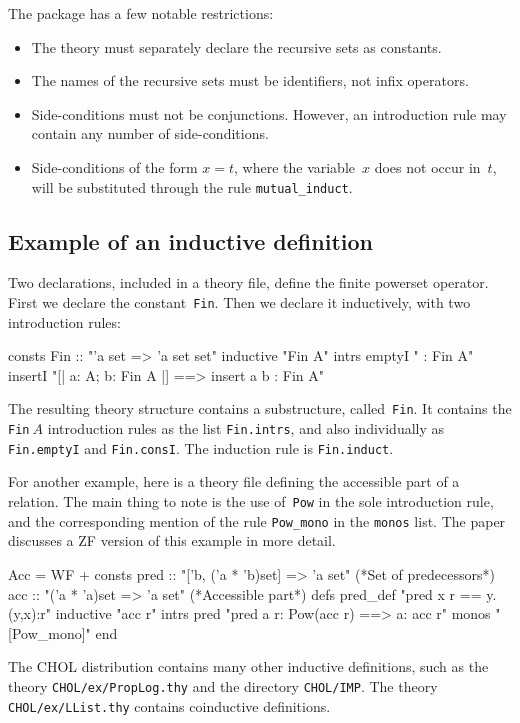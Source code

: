 The package has a few notable restrictions:
\begin{itemize}
\item The theory must separately declare the recursive sets as
  constants.

\item The names of the recursive sets must be identifiers, not infix
operators.  

\item Side-conditions must not be conjunctions.  However, an introduction rule
may contain any number of side-conditions.

\item Side-conditions of the form $x=t$, where the variable~$x$ does not
  occur in~$t$, will be substituted through the rule \verb|mutual_induct|.
\end{itemize}


\subsection{Example of an inductive definition}
Two declarations, included in a theory file, define the finite powerset
operator.  First we declare the constant~{\tt Fin}.  Then we declare it
inductively, with two introduction rules:
\begin{ttbox}
consts Fin :: "'a set => 'a set set"
inductive "Fin A"
  intrs
    emptyI  "{} : Fin A"
    insertI "[| a: A;  b: Fin A |] ==> insert a b : Fin A"
\end{ttbox}
The resulting theory structure contains a substructure, called~{\tt Fin}.
It contains the {\tt Fin}$~A$ introduction rules as the list {\tt Fin.intrs},
and also individually as {\tt Fin.emptyI} and {\tt Fin.consI}.  The induction
rule is {\tt Fin.induct}.

For another example, here is a theory file defining the accessible part of a
relation.  The main thing to note is the use of~{\tt Pow} in the sole
introduction rule, and the corresponding mention of the rule
\verb|Pow_mono| in the {\tt monos} list.  The paper discusses a ZF version
of this example in more detail.
\begin{ttbox}
Acc = WF + 
consts pred :: "['b, ('a * 'b)set] => 'a set"   (*Set of predecessors*)
       acc  :: "('a * 'a)set => 'a set"         (*Accessible part*)
defs   pred_def  "pred x r == {y. (y,x):r}"
inductive "acc r"
  intrs
     pred "pred a r: Pow(acc r) ==> a: acc r"
  monos   "[Pow_mono]"
end
\end{ttbox}
The CHOL distribution contains many other inductive definitions, such as the
theory {\tt CHOL/ex/PropLog.thy} and the directory {\tt CHOL/IMP}.  The
theory {\tt CHOL/ex/LList.thy} contains coinductive definitions.

